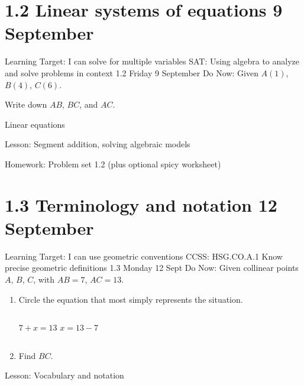 \section{1.2 Linear systems of equations \hfill 9 September}
\begin{frame}{Learning Target: I can solve for multiple variables}
  {SAT: Using algebra to analyze and solve problems in
  context \hfill \alert{1.2 Friday 9 September}}
  Do Now: Given $A(1)$, $B(4)$, $C(6)$. \par \medskip
  Write down $AB$, $BC$, and $AC$.
  \begin{center}
    \item Linear equations
  \end{center} \vspace{1cm}
  Lesson: Segment addition, solving algebraic models \par \medskip
  Homework: Problem set 1.2 (plus optional spicy worksheet)
  \end{frame}

\section{1.3 Terminology and notation \hfill 12 September}
\begin{frame}{Learning Target: I can use geometric conventions}
  {CCSS: HSG.CO.A.1 Know precise geometric definitions \hfill \alert{1.3 Monday 12 Sept}}
  Do Now: Given collinear points $A$, $B$, $C$, with $AB=7$, $AC=13$.
  \begin{center}
  \end{center}
  \begin{enumerate}
    \item Circle the equation that most simply represents the situation. \medskip
    \begin{columns}[c]
      \qquad \hspace{2cm} $7 + x = 13$
      $x = 13 - 7$
    \end{columns}
    \item Find $BC$.
  \end{enumerate} \vspace{2cm}
  Lesson: Vocabulary and notation
  \end{frame}


